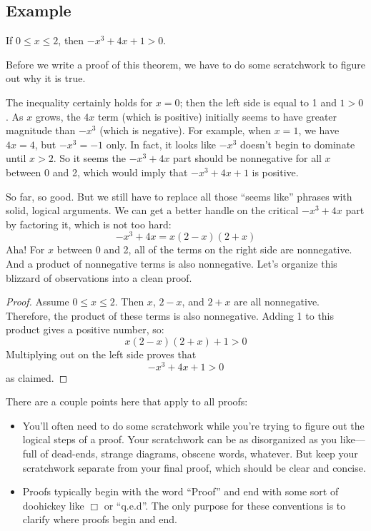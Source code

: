 \subsection*{Example}

\begin{theorem}
If $0 \leq x \leq 2$, then $-x^3 + 4x + 1 > 0$.
\end{theorem}

Before we write a proof of this theorem, we have to do some
scratchwork to figure out why it is true.

The inequality certainly holds for $x = 0$; then the left side is
equal to 1 and $1 > 0$.  As $x$ grows, the $4x$ term (which is
positive) initially seems to have greater magnitude than $-x^3$ (which
is negative).  For example, when $x = 1$, we have $4x = 4$, but $-x^3
= -1$ only.  In fact, it looks like $-x^3$ doesn't begin to dominate
until $x > 2$.  So it seems the $-x^3 + 4x$ part should be nonnegative
for all $x$ between 0 and 2, which would imply that $-x^3 + 4x + 1$ is
positive.

So far, so good.  But we still have to replace all those ``seems
like'' phrases with solid, logical arguments.  We can get a better
handle on the critical $-x^3 + 4x$ part by factoring it, which is not
too hard:
%
\[
-x^3 + 4x = x (2 - x)(2 + x)
\]
%
Aha!  For $x$ between 0 and 2, all of the terms on the right side are
nonnegative.  And a product of nonnegative terms is also nonnegative.
Let's organize this blizzard of observations into a clean proof.

\begin{proof}
Assume $0 \leq x \leq 2$.  Then $x$, $2 - x$, and $2 + x$ are all
nonnegative.  Therefore, the product of these terms is also
nonnegative.  Adding 1 to this product gives a positive number, so:
%
\[
x (2 - x)(2 + x) + 1 > 0
\]
%
Multiplying out on the left side proves that
%
\[
-x^3 + 4x + 1 > 0
\]
%
as claimed.
\end{proof}

There are a couple points here that apply to all proofs:
%
\begin{itemize}

\item You'll often need to do some scratchwork while you're trying to
figure out the logical steps of a proof.  Your scratchwork can be as
disorganized as you like--- full of dead-ends, strange diagrams,
obscene words, whatever.  But keep your scratchwork separate from your
final proof, which should be clear and concise.

\item Proofs typically begin with the word ``Proof'' and end with some
sort of doohickey like $\Box$ or ``q.e.d''.  The only purpose for
these conventions is to clarify where proofs begin and end.

\end{itemize}

